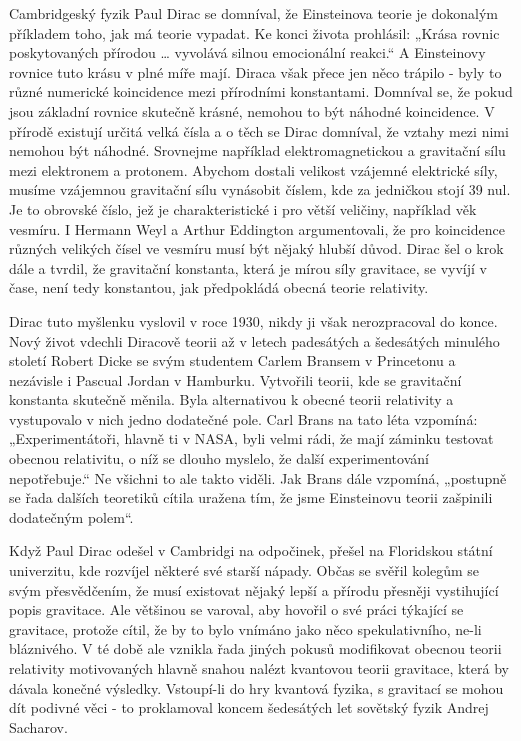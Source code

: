   Cambridgeský fyzik Paul Dirac se domníval, že Einsteinova teorie je dokonalým příkladem toho, jak
  má teorie vypadat. Ke konci života prohlásil: „Krása rovnic poskytovaných přírodou … vyvolává
  silnou emocionální reakci.“ A Einsteinovy rovnice tuto krásu v plné míře mají. Diraca však přece
  jen něco trápilo - byly to různé numerické koincidence mezi přírodními konstantami. Domníval se,
  že pokud jsou základní rovnice skutečně krásné, nemohou to být náhodné koincidence. V přírodě
  existují určitá velká čísla a o těch se Dirac domníval, že vztahy mezi nimi nemohou být náhodné.
  Srovnejme například elektromagnetickou a gravitační sílu mezi elektronem a protonem. Abychom
  dostali velikost vzájemné elektrické síly, musíme vzájemnou gravitační sílu vynásobit číslem, kde
  za jedničkou stojí 39 nul. Je to obrovské číslo, jež je charakteristické i pro větší veličiny,
  například věk vesmíru. I Hermann Weyl a Arthur Eddington argumentovali, že pro koincidence různých
  velikých čísel ve vesmíru musí být nějaký hlubší důvod. Dirac šel o krok dále a tvrdil, že
  gravitační konstanta, která je mírou síly gravitace, se vyvíjí v čase, není tedy konstantou, jak
  předpokládá obecná teorie relativity. 
  
  Dirac tuto myšlenku vyslovil v roce 1930, nikdy ji však nerozpracoval do konce. Nový život vdechli
  Diracově teorii až v letech padesátých a šedesátých minulého století Robert Dicke se svým
  studentem Carlem Bransem v Princetonu a nezávisle i Pascual Jordan v Hamburku. Vytvořili teorii,
  kde se gravitační konstanta skutečně měnila. Byla alternativou k obecné teorii relativity a
  vystupovalo v nich jedno dodatečné pole. Carl Brans na tato léta vzpomíná: „Experimentátoři,
  hlavně ti v NASA, byli velmi rádi, že mají záminku testovat obecnou relativitu, o níž se dlouho
  myslelo, že další experimentování nepotřebuje.“ Ne všichni to ale takto viděli. Jak Brans dále
  vzpomíná, „postupně se řada dalších teoretiků cítila uražena tím, že jsme Einsteinovu teorii
  zašpinili dodatečným polem“. 
  
  Když Paul Dirac odešel v Cambridgi na odpočinek, přešel na Floridskou státní univerzitu, kde
  rozvíjel některé své starší nápady. Občas se svěřil kolegům se svým přesvědčením, že musí
  existovat nějaký lepší a přírodu přesněji vystihující popis gravitace. Ale většinou se varoval,
  aby hovořil o své práci týkající se gravitace, protože cítil, že by to bylo vnímáno jako něco
  spekulativního, ne-li bláznivého. V té době ale vznikla řada jiných pokusů modifikovat obecnou
  teorii relativity motivovaných hlavně snahou nalézt kvantovou teorii gravitace, která by dávala
  konečné výsledky. Vstoupí-li do hry kvantová fyzika, s gravitací se mohou dít podivné věci - to
  proklamoval koncem šedesátých let sovětský fyzik Andrej Sacharov. 
  
